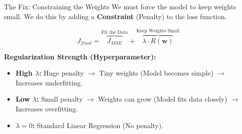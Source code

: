 \begin{frame}{The Fix: Constraining the Weights}
    We must force the model to keep weights small. We do this by adding a \textbf{Constraint} (Penalty) to the loss function.
    
    \centering

    \vspace{-2em}
    \large
    $$ J_{final} = \overbrace{J_{MSE}}^{\text{Fit the Data}} + \overbrace{\lambda \cdot R(\mathbf{w})}^{\text{Keep Weights Small}} $$
    \normalsize
    
    \begin{tcolorbox}[colback=yellow!10, colframe=orange!60, title=\textbf{What is $\lambda$ (Lambda)?}]
        \textbf{Regularization Strength (Hyperparameter):}
        \begin{itemize}
            \item \textbf{High $\lambda$:} Huge penalty $\to$ Tiny weights (Model becomes simple) $\to$ Increases underfitting.
            \item \textbf{Low $\lambda$:} Small penalty $\to$ Weights can grow (Model fits data closely) $\to$ Increases overfitting.
            \item \textbf{$\lambda = 0$:} Standard Linear Regression (No penalty).
        \end{itemize}
    \end{tcolorbox}
\end{frame}

